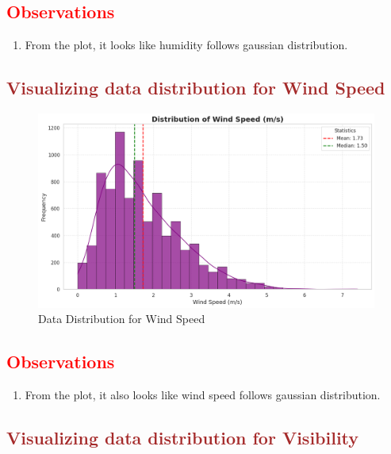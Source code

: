 \documentclass[12pt, letterpaper]{article}
\begin{document}
\subsection*{\textcolor{red}{Observations}}
\begin{enumerate}
  \item From the plot, it looks like humidity follows gaussian distribution.
\end{enumerate}

\newpage

\subsection*{\textcolor{brown}{Visualizing data distribution for Wind Speed}}

\begin{figure}[h]
  \centering
  \includegraphics[width=1\textwidth]{windspeed.png}
  \caption{Data Distribution for Wind Speed}
\end{figure}

\subsection*{\textcolor{red}{Observations}}
\begin{enumerate}
  \item From the plot, it also looks like wind speed follows gaussian distribution.
\end{enumerate}

\newpage

\subsection*{\textcolor{brown}{Visualizing data distribution for Visibility}}
\end{document}
